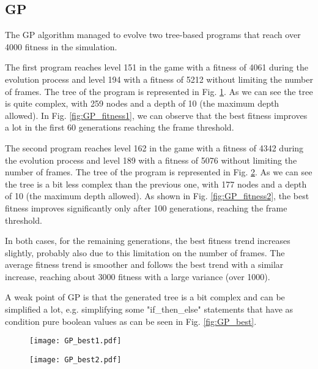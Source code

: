 \subsection{GP}
The GP algorithm managed to evolve two tree-based programs that reach over 4000 fitness in the simulation.

The first program reaches level 151 in the
game with a fitness of 4061 during the evolution process and level 194 with a fitness of 5212
without limiting the number of frames. The tree of the program is represented in Fig. \ref{fig:GP_best1}. As
we can see the tree is quite complex, with 259 nodes and a depth of 10 (the maximum depth
allowed). In Fig. \ref{fig:GP_fitness1}, we can observe that the best fitness improves a lot in the first 60
generations reaching the frame threshold.

The second program reaches level 162 in the game with a fitness of 4342 during the evolution process and 
level 189 with a fitness of 5076 without limiting the number of frames. The tree of the program is 
represented in Fig. \ref{fig:GP_best2}. As we can see the tree is a bit less complex than the previous one, with 177 nodes 
and a depth of 10 (the maximum depth allowed). As shown in Fig. \ref{fig:GP_fitness2}, the best fitness improves significantly 
only after 100 generations, reaching the frame threshold.

In both cases, for the remaining generations, the best fitness trend increases slightly, probably also due 
to this limitation on the number of frames. The average fitness trend is smoother and follows the best trend 
with a similar increase, reaching about 3000 fitness with a large variance (over 1000).

A weak point of GP is that the generated tree is a bit complex and can be simplified a lot,
e.g. simplifying some "if\_then\_else" statements that have as condition pure boolean values as can be
seen in Fig. \ref{fig:GP_best}.

\begin{figure*}[t!]
    \centering
    \begin{subfigure}[b]{0.45\textwidth}
        \centering
        \texttt{[image: GP\_best1.pdf]}
        \caption{}
        \label{fig:GP_best1}
    \end{subfigure}
    \hspace{1mm}
    \begin{subfigure}[b]{0.45\textwidth}
        \centering
        \texttt{[image: GP\_best2.pdf]}
        \caption{}
        \label{fig:GP_best2}
    \end{subfigure}
       \caption{Best tree-based programs generated by GP.}
       \label{fig:GP_best}
\end{figure*}


